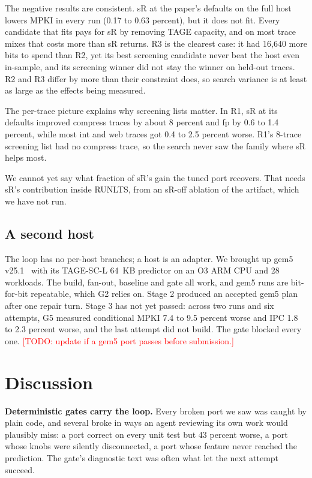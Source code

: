 \documentclass[conference]{IEEEtran}
\newcommand{\todo}[1]{\textcolor{red}{[TODO: #1]}}
\begin{document}
The negative results are consistent. sR at the paper's defaults on the full
host lowers MPKI in every run (0.17 to 0.63 percent), but it does not fit.
Every candidate that fits pays for sR by removing TAGE capacity, and on most
trace mixes that costs more than sR returns. R3 is the clearest case: it had
16,640 more bits to spend than R2, yet its best screening candidate never beat
the host even in-sample, and its screening winner did not stay the winner on
held-out traces. R2 and R3 differ by more than their constraint does, so
search variance is at least as large as the effects being measured.

The per-trace picture explains why screening lists matter. In R1, sR at its
defaults improved compress traces by about 8 percent and fp by 0.6 to 1.4
percent, while most int and web traces got 0.4 to 2.5 percent worse. R1's
8-trace screening list had no compress trace, so the search never saw the
family where sR helps most.

We cannot yet say what fraction of sR's gain the tuned port recovers. That
needs sR's contribution inside RUNLTS, from an sR-off ablation of the
artifact, which we have not run.

\subsection{A second host}

The loop has no per-host branches; a host is an adapter. We brought up gem5
v25.1~\cite{gem5} with its TAGE-SC-L 64~KB predictor on an O3 ARM CPU and 28
workloads. The build, fan-out, baseline and gate all work, and gem5 runs are
bit-for-bit repeatable, which G2 relies on. Stage 2 produced an accepted gem5
plan after one repair turn. Stage 3 has not yet passed: across two runs and six
attempts, G5 measured conditional MPKI 7.4 to 9.5 percent worse and IPC 1.8 to
2.3 percent worse, and the last attempt did not build. The gate blocked every
one. \todo{update if a gem5 port passes before submission.}

\section{Discussion}

\textbf{Deterministic gates carry the loop.} Every broken port we saw was
caught by plain code, and several broke in ways an agent reviewing its own
work would plausibly miss: a port correct on every unit test but 43 percent
worse, a port whose knobs were silently disconnected, a port whose feature never
reached the prediction. The gate's diagnostic text was often what let the next
attempt succeed.
\end{document}

